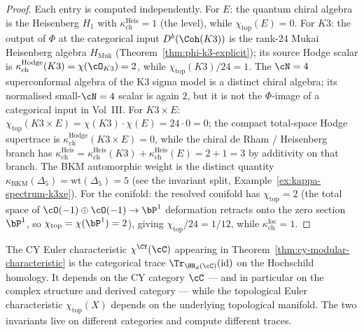 \begin{proof}
Each entry is computed independently. For $E$: the quantum chiral algebra is the Heisenberg $H_1$ with $\kappa_{\mathrm{ch}}^{\mathrm{Heis}} = 1$ (the level), while $\chi_{\mathrm{top}}(E) = 0$. For $K3$: the output of $\Phi$ at the categorical input $D^b(\Coh(K3))$ is the rank-$24$ Mukai Heisenberg algebra $H_{\mathrm{Muk}}$ (Theorem~\ref{thm:phi-k3-explicit}); its source Hodge scalar is $\kappa_{\mathrm{ch}}^{\mathrm{Hodge}}(K3)=\chi(\cO_{K3})=2$, while $\chi_{\mathrm{top}}(K3)/24 = 1$. The $\cN=4$ superconformal algebra of the K3 sigma model is a distinct chiral algebra; its normalised small-$\cN=4$ scalar is again $2$, but it is not the $\Phi$-image of a categorical input in Vol~III. For $K3 \times E$: $\chi_{\mathrm{top}}(K3 \times E) = \chi(K3) \cdot \chi(E) = 24 \cdot 0 = 0$; the compact total-space Hodge supertrace is $\kappa_{\mathrm{ch}}^{\mathrm{Hodge}}(K3\times E)=0$, while the chiral de Rham / Heisenberg branch has $\kappa_{\mathrm{ch}}^{\mathrm{Heis}} = \kappa_{\mathrm{ch}}^{\mathrm{Heis}}(K3) + \kappa_{\mathrm{ch}}^{\mathrm{Heis}}(E) = 2 + 1 = 3$ by additivity on that branch. The BKM automorphic weight is the distinct quantity $\kappa_{\mathrm{BKM}}(\Delta_5) = \mathrm{wt}(\Delta_5) = 5$ (see the invariant split, Example~\ref{ex:kappa-spectrum-k3xe}). For the conifold: the resolved conifold has $\chi_{\mathrm{top}} = 2$ (the total space of $\cO(-1) \oplus \cO(-1) \to \bP^1$ deformation retracts onto the zero section $\bP^1$, so $\chi_{\mathrm{top}} = \chi(\bP^1) = 2$), giving $\chi_{\mathrm{top}}/24 = 1/12$, while $\kappa_{\mathrm{ch}}^{\mathrm{loc}} = 1$.
\end{proof}

\begin{remark}
\label{rem:categorical-vs-topological-chi}
The CY Euler characteristic $\chi^{\CY}(\cC)$ appearing in
Theorem~\ref{thm:cy-modular-characteristic} is the categorical trace
$\Tr_{\HH_d(\cC)}(\mathrm{id})$ on the Hochschild homology. It
depends on the CY category $\cC$ — and in particular on the complex
structure and derived category — while the topological Euler
characteristic $\chi_{\mathrm{top}}(X)$ depends on the underlying
topological manifold. The two invariants live on different
categories and compute different traces.
\end{remark}

